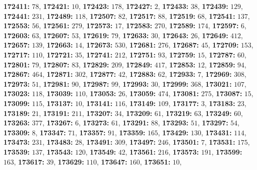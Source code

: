 \textsf{\bfseries 172411:} $78$, \textsf{\bfseries 172421:} $10$, \textsf{\bfseries 172423:} $178$, \textsf{\bfseries 172427:} $2$, \textsf{\bfseries 172433:} $38$, \textsf{\bfseries 172439:} $129$, \textsf{\bfseries 172441:} $231$, \textsf{\bfseries 172489:} $118$, \textsf{\bfseries 172507:} $82$, \textsf{\bfseries 172517:} $88$, \textsf{\bfseries 172519:} $68$, \textsf{\bfseries 172541:} $137$, \textsf{\bfseries 172553:} $56$, \textsf{\bfseries 172561:} $279$, \textsf{\bfseries 172573:} $17$, \textsf{\bfseries 172583:} $270$, \textsf{\bfseries 172589:} $174$, \textsf{\bfseries 172597:} $6$, \textsf{\bfseries 172603:} $63$, \textsf{\bfseries 172607:} $53$, \textsf{\bfseries 172619:} $79$, \textsf{\bfseries 172633:} $30$, \textsf{\bfseries 172643:} $26$, \textsf{\bfseries 172649:} $412$, \textsf{\bfseries 172657:} $139$, \textsf{\bfseries 172663:} $14$, \textsf{\bfseries 172673:} $530$, \textsf{\bfseries 172681:} $276$, \textsf{\bfseries 172687:} $45$, \textsf{\bfseries 172709:} $153$, \textsf{\bfseries 172717:} $110$, \textsf{\bfseries 172721:} $35$, \textsf{\bfseries 172741:} $212$, \textsf{\bfseries 172751:} $93$, \textsf{\bfseries 172759:} $15$, \textsf{\bfseries 172787:} $60$, \textsf{\bfseries 172801:} $79$, \textsf{\bfseries 172807:} $83$, \textsf{\bfseries 172829:} $209$, \textsf{\bfseries 172849:} $417$, \textsf{\bfseries 172853:} $12$, \textsf{\bfseries 172859:} $94$, \textsf{\bfseries 172867:} $464$, \textsf{\bfseries 172871:} $302$, \textsf{\bfseries 172877:} $42$, \textsf{\bfseries 172883:} $62$, \textsf{\bfseries 172933:} $7$, \textsf{\bfseries 172969:} $308$, \textsf{\bfseries 172973:} $51$, \textsf{\bfseries 172981:} $90$, \textsf{\bfseries 172987:} $99$, \textsf{\bfseries 172993:} $30$, \textsf{\bfseries 172999:} $368$, \textsf{\bfseries 173021:} $107$, \textsf{\bfseries 173023:} $118$, \textsf{\bfseries 173039:} $110$, \textsf{\bfseries 173053:} $26$, \textsf{\bfseries 173059:} $474$, \textsf{\bfseries 173081:} $275$, \textsf{\bfseries 173087:} $15$, \textsf{\bfseries 173099:} $115$, \textsf{\bfseries 173137:} $10$, \textsf{\bfseries 173141:} $116$, \textsf{\bfseries 173149:} $109$, \textsf{\bfseries 173177:} $3$, \textsf{\bfseries 173183:} $23$, \textsf{\bfseries 173189:} $21$, \textsf{\bfseries 173191:} $211$, \textsf{\bfseries 173207:} $34$, \textsf{\bfseries 173209:} $61$, \textsf{\bfseries 173219:} $63$, \textsf{\bfseries 173249:} $60$, \textsf{\bfseries 173263:} $377$, \textsf{\bfseries 173267:} $6$, \textsf{\bfseries 173273:} $61$, \textsf{\bfseries 173291:} $88$, \textsf{\bfseries 173293:} $51$, \textsf{\bfseries 173297:} $54$, \textsf{\bfseries 173309:} $8$, \textsf{\bfseries 173347:} $71$, \textsf{\bfseries 173357:} $91$, \textsf{\bfseries 173359:} $165$, \textsf{\bfseries 173429:} $130$, \textsf{\bfseries 173431:} $114$, \textsf{\bfseries 173473:} $231$, \textsf{\bfseries 173483:} $28$, \textsf{\bfseries 173491:} $309$, \textsf{\bfseries 173497:} $246$, \textsf{\bfseries 173501:} $7$, \textsf{\bfseries 173531:} $175$, \textsf{\bfseries 173539:} $137$, \textsf{\bfseries 173543:} $120$, \textsf{\bfseries 173549:} $42$, \textsf{\bfseries 173561:} $216$, \textsf{\bfseries 173573:} $191$, \textsf{\bfseries 173599:} $163$, \textsf{\bfseries 173617:} $39$, \textsf{\bfseries 173629:} $110$, \textsf{\bfseries 173647:} $160$, \textsf{\bfseries 173651:} $10$, 
